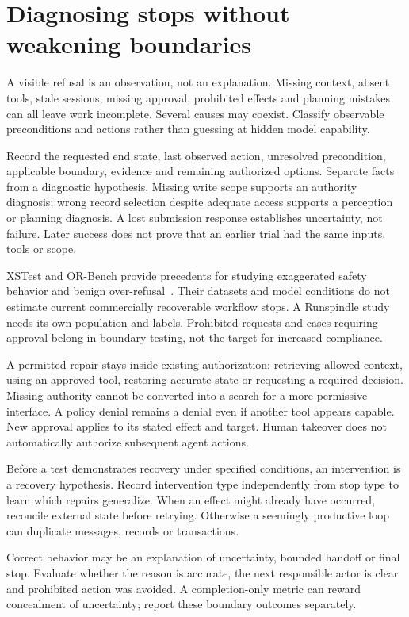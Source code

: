 \documentclass[11pt,letterpaper]{article}
\begin{document}
\section{Diagnosing stops without weakening boundaries}
\label{sec:stops}
A visible refusal is an observation, not an explanation. Missing context, absent
tools, stale sessions, missing approval, prohibited effects and planning mistakes
can all leave work incomplete. Several causes may coexist. Classify observable
preconditions and actions rather than guessing at hidden model capability.

Record the requested end state, last observed action, unresolved precondition,
applicable boundary, evidence and remaining authorized options. Separate facts
from a diagnostic hypothesis. Missing write scope supports an authority diagnosis;
wrong record selection despite adequate access supports a perception or planning
diagnosis. A lost submission response establishes uncertainty, not failure. Later
success does not prove that an earlier trial had the same inputs, tools or scope.



XSTest and OR-Bench provide precedents for studying exaggerated safety behavior
and benign over-refusal~\cite{xstest,orbench}. Their datasets and model conditions
do not estimate current commercially recoverable workflow stops. A Runspindle
study needs its own population and labels. Prohibited requests and cases requiring
approval belong in boundary testing, not the target for increased compliance.

A permitted repair stays inside existing authorization: retrieving allowed
context, using an approved tool, restoring accurate state or requesting a required
decision. Missing authority cannot be converted into a search for a more permissive
interface. A policy denial remains a denial even if another tool appears capable.
New approval applies to its stated effect and target. Human takeover does not
automatically authorize subsequent agent actions.

Before a test demonstrates recovery under specified conditions, an intervention
is a recovery hypothesis. Record intervention type independently from stop type
to learn which repairs generalize. When an effect might already have occurred,
reconcile external state before retrying. Otherwise a seemingly productive loop
can duplicate messages, records or transactions.

Correct behavior may be an explanation of uncertainty, bounded handoff or final
stop. Evaluate whether the reason is accurate, the next responsible actor is clear
and prohibited action was avoided. A completion-only metric can reward concealment
of uncertainty; report these boundary outcomes separately.
\end{document}
